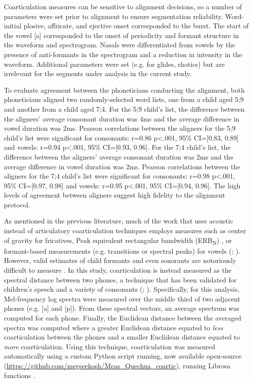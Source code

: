 \documentclass[a4paper,man,floatsintext,natbib,donotrepeattitle, apacite]{apa6}
\begin{document}
Coarticulation measures can be sensitive to alignment decisions, so a number of parameters were set prior to alignment to ensure segmentation reliability. Word-initial plosive, affricate, and ejective onset corresponded to the burst. The start of the vowel [a] corresponded to the onset of periodicity and formant structure in the waveform and spectrogram. Nasals were differentiated from vowels by the presence of anti-formants in the spectrogram and a reduction in intensity in the waveform. Additional parameters were set (e.g. for glides, rhotics) but are irrelevant for the segments under analysis in the current study. 

To evaluate agreement between the phoneticians conducting the alignment, both phoneticians aligned two randomly-selected word lists, one from a child aged 5;9 and another from a child aged 7;4. For the 5;9 child's list, the difference between the aligners’ average consonant duration was 4ms and the average difference in vowel duration was 2ms. Pearson correlations between the aligners for the 5;9 child's list were significant for consonants: r=0.86 p<.001, 95\% CI=[0.83, 0.89] and vowels: r=0.94 p<.001, 95\% CI=[0.93, 0.96]. For the 7;4 child's list, the difference between the aligners’ average consonant duration was 2ms and the average difference in vowel duration was 2ms. Pearson correlations between the aligners for the 7;4 child's list were significant for consonants: r=0.98 p<.001, 95\% CI=[0.97, 0.98] and vowels: r=0.95 p<.001, 95\% CI=[0.94, 0.96]. The high levels of agreement between aligners suggest high fidelity to the alignment protocol.

As mentioned in the previous literature, much of the work that uses acoustic instead of articulatory coarticulation techniques employs measures such as center of gravity for fricatives, Peak equivalent rectangular bandwidth (ERB\textsubscript{N}) \citep{reidyAcousticsWordInitialFricatives2017}, or formant-based measurements (e.g. transitions or spectral peaks) for vowels (\citealt{lehistePerceptionCoarticulationEffects1972}; \citealt{ohmanCoarticulationVCVUtterances1966}). However, valid estimates of child formants and even sonorants are notoriously difficult to measure \citep{chenF0inducedFormantMeasurement2019}. In this study, coarticulation is instead measured as the spectral distance between two phones, a technique that has been validated for children's speech and a variety of consonants (\citealt{cychoszSpectralTemporalMeasures2019}; \citealt{gerosaAnalyzingChildrenSpeech2006}). Specifically, for this analysis, Mel-frequency log spectra were measured over the middle third of two adjacent phones (e.g. [a] and [p]). From these spectral vectors, an average spectrum was computed for each phone. Finally, the Euclidean distance between the averaged spectra was computed where a greater Euclidean distance equated to \textit{less} coarticulation between the phones and a smaller Euclidean distance equated to \textit{more} coarticulation. Using this technique, coarticulation was measured automatically using a custom Python script running, now available open-source (\url{https://github.com/megseekosh/Meas_Quechua_coartic}), running Librosa functions \citep{mcfeeLibrosaAudioMusic2015}. 
\end{document}
